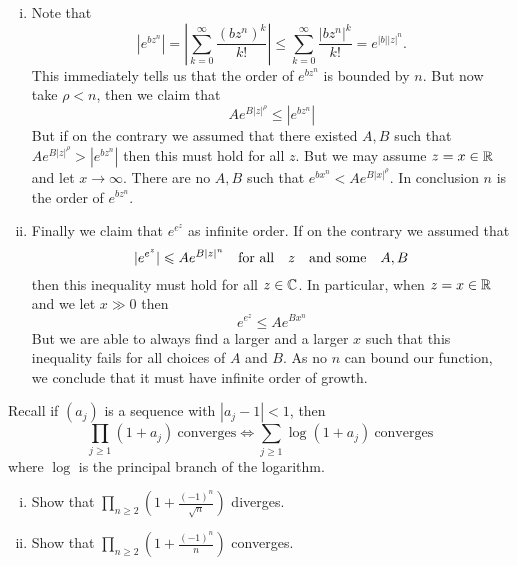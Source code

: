 \documentclass[12pt]{memoir}
\begin{document}
\begin{ptcbr}
\begin{enumerate}[i)]
        \item Note that 
        $$|e^{bz^n}|=\left|\sum_{k=0}^{\infty}\frac{(bz^n)^k}{k!}\right|\leq \sum_{k=0}^{\infty}\frac{|bz^n|^k}{k!}=e^{|b||z|^n}.$$
        This immediately tells us that the order of $e^{bz^n}$ is bounded by $n$. But now take $\rho<n$, then we claim that 
        $$Ae^{B|z|^\rho}\leq |e^{bz^n}|$$
        But if on the contrary we assumed that there existed $A,B$ such that $Ae^{B|z|^\rho}> |e^{bz^n}|$ then this must hold for all $z$. But we may assume $z=x\in\mathbb{R}$ and let $x\to\infty$. There are no $A,B$ such that $ e^{bx^n}<Ae^{B|x|^\rho}$. In conclusion $n$ is the order of $e^{bz^n}$.
    \item Finally we claim that $e^{e^z}$ as infinite order. If on the contrary we assumed that 
    $$|e^{e^z}|\leqslant Ae^{B|z|^n}\quad\text{for all}\quad z\quad\text{and some}\quad A,B$$
    then this inequality must hold for all $z\in\mathbb{C}$. In particular, when $z=x\in\mathbb{R}$ and we let $x\gg 0$ then 
    $$e^{e^z}\leq Ae^{Bx^n}$$
    But we are able to always find a larger and a larger $x$ such that this inequality fails for all choices of $A$ and $B$. As no $n$ can bound our function, we conclude that it must have infinite order of growth.
    \end{enumerate}
\end{ptcbr}


\begin{Ej}
    Recall if $(a_j)$ is a sequence with $|a_j-1|<1$, then 
    $$\prod_{j\geq 1}(1+a_j)\ \text{converges}\iff\sum_{j\geq 1}\log(1+a_j)\ \text{converges}$$
    where $\log$ is the principal branch of the logarithm.
    \begin{enumerate}[i)]
        \itemsep=-0.4em
        \item Show that $\prod_{n\geq 2}\left(1+\frac{(-1)^n}{\sqrt{n}}\right)$ diverges.
        \item Show that $\prod_{n\geq 2}\left(1+\frac{(-1)^n}{n}\right)$ converges.
    \end{enumerate}
    \end{Ej}
\end{document}
